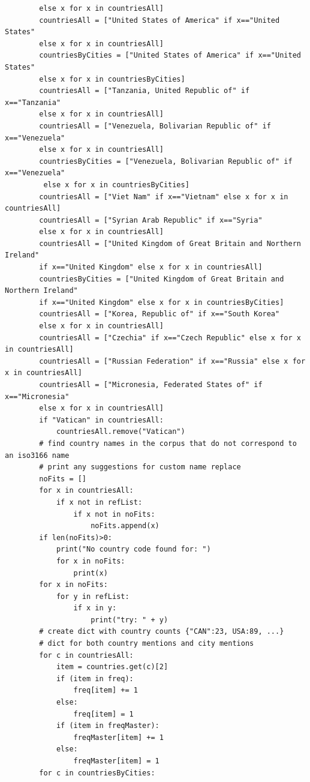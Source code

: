 \begin{lstlisting}
        else x for x in countriesAll]
        countriesAll = ["United States of America" if x=="United States" 
        else x for x in countriesAll]
        countriesByCities = ["United States of America" if x=="United States" 
        else x for x in countriesByCities]
        countriesAll = ["Tanzania, United Republic of" if x=="Tanzania" 
        else x for x in countriesAll]
        countriesAll = ["Venezuela, Bolivarian Republic of" if x=="Venezuela" 
        else x for x in countriesAll]
        countriesByCities = ["Venezuela, Bolivarian Republic of" if x=="Venezuela"
         else x for x in countriesByCities]
        countriesAll = ["Viet Nam" if x=="Vietnam" else x for x in countriesAll]
        countriesAll = ["Syrian Arab Republic" if x=="Syria" 
        else x for x in countriesAll]
        countriesAll = ["United Kingdom of Great Britain and Northern Ireland" 
        if x=="United Kingdom" else x for x in countriesAll]
        countriesByCities = ["United Kingdom of Great Britain and Northern Ireland"
        if x=="United Kingdom" else x for x in countriesByCities]
        countriesAll = ["Korea, Republic of" if x=="South Korea" 
        else x for x in countriesAll]
        countriesAll = ["Czechia" if x=="Czech Republic" else x for x in countriesAll]
        countriesAll = ["Russian Federation" if x=="Russia" else x for x in countriesAll]
        countriesAll = ["Micronesia, Federated States of" if x=="Micronesia" 
        else x for x in countriesAll]
        if "Vatican" in countriesAll:
            countriesAll.remove("Vatican")
        # find country names in the corpus that do not correspond to an iso3166 name
        # print any suggestions for custom name replace
        noFits = []
        for x in countriesAll:
            if x not in refList:
                if x not in noFits:
                    noFits.append(x)
        if len(noFits)>0:
            print("No country code found for: ")
            for x in noFits:
                print(x)
        for x in noFits:
            for y in refList:
                if x in y:
                    print("try: " + y)
        # create dict with country counts {"CAN":23, USA:89, ...} 
        # dict for both country mentions and city mentions
        for c in countriesAll: 
            item = countries.get(c)[2]
            if (item in freq): 
                freq[item] += 1
            else: 
                freq[item] = 1
            if (item in freqMaster): 
                freqMaster[item] += 1
            else: 
                freqMaster[item] = 1
        for c in countriesByCities: 

\end{lstlisting}
